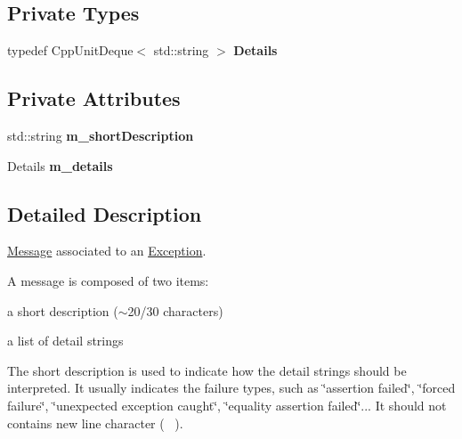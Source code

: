 \subsection*{Private Types}
\begin{DoxyCompactItemize}
\item 
typedef Cpp\+Unit\+Deque$<$ std\+::string $>$ {\bfseries Details}\hypertarget{class_message_a71eda01128a0b2e5ce9ba435acec444d}{}\label{class_message_a71eda01128a0b2e5ce9ba435acec444d}

\end{DoxyCompactItemize}
\subsection*{Private Attributes}
\begin{DoxyCompactItemize}
\item 
std\+::string {\bfseries m\+\_\+short\+Description}\hypertarget{class_message_a1ba9f26d158871cf99d1c47ed0316fb8}{}\label{class_message_a1ba9f26d158871cf99d1c47ed0316fb8}

\item 
Details {\bfseries m\+\_\+details}\hypertarget{class_message_a884886368af298a588ca3e26a12697c1}{}\label{class_message_a884886368af298a588ca3e26a12697c1}

\end{DoxyCompactItemize}


\subsection{Detailed Description}
\hyperlink{class_message}{Message} associated to an \hyperlink{class_exception}{Exception}.

A message is composed of two items\+: 


\begin{DoxyItemize}
\item a short description ($\sim$20/30 characters)
\item a list of detail strings
\end{DoxyItemize}

The short description is used to indicate how the detail strings should be interpreted. It usually indicates the failure types, such as \char`\"{}assertion failed\char`\"{}, \char`\"{}forced failure\char`\"{}, \char`\"{}unexpected exception caught\char`\"{}, \char`\"{}equality assertion failed\char`\"{}... It should not contains new line character (~\newline
).

